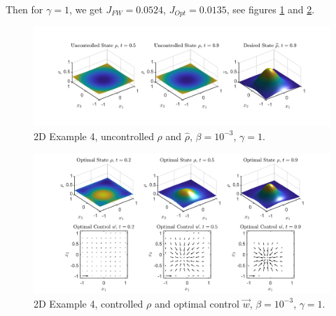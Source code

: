 \documentclass[11pt, a4paper]{article}
\theoremstyle{definition}
\begin{document}
Then for $\gamma = 1$, we get $J_{FW} = 0.0524$, $J_{Opt} = 0.0135$, see figures \ref{rhoHat2dEx4a} and \ref{rhoOpt2dEx4a}.
\begin{figure}[h]
	\includegraphics[scale=0.3]{Res1Ex4a.png}
	\caption{2D Example 4, uncontrolled $\rho$ and $\widehat \rho$, $\beta = 10^{-3}$, $\gamma = 1$.}
	\label{rhoHat2dEx4a}
\end{figure}
\begin{figure}[h]
	\includegraphics[scale=0.3]{Res2Ex4a.png}
	\caption{2D Example 4, controlled $\rho$ and optimal control $\vec{w}$, $\beta = 10^{-3}$, $\gamma = 1$.}
	\label{rhoOpt2dEx4a}
\end{figure}
\end{document}
